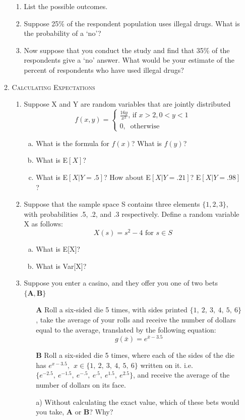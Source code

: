 \documentclass[11pt,letterpaper]{article}
\numberwithin{equation}{section}
\begin{document}
\begin{enumerate}[I]
\begin{enumerate}[1)]
\begin{enumerate}[1)]
\item List the possible outcomes.
\item Suppose 25\% of the respondent population uses illegal drugs. What is the probability of a `no'? 
\item  Now suppose that you conduct the study and find that 35\% of the respondents give a `no' answer. What would be your estimate of the percent of respondents who have used illegal drugs?
\end{enumerate}
\pagebreak
\item \textsc{Calculating Expectations}
\begin{enumerate}[1)]

\item Suppose X and Y are random variables that are jointly distributed 
$$f(x,y)=\begin{cases} \frac{16y}{x^3} \text{, if }x>2, 0<y<1\\ 0, \ \text{ otherwise }\end{cases}$$

\begin{enumerate}[a)]
\item What is the formula for $f(x)$?  What is $f(y)$? 
\item What is E$[X]$? 
\item What is E$[X|Y=.5]$?  How about E$[X|Y=.21]$? E$[X|Y=.98]$?
\end{enumerate}

\item Suppose that the sample space S contains three elements $\{1, 2, 3\}$, with probabilities .5, .2, and .3 respectively.  Define a random variable X as follows:
$$X(s) = s^2 - 4 \text{ for } s \in S$$ 
\begin{enumerate}[a)]
\item What is E[X]? 
\item What is Var[X]?
\end{enumerate}

\item Suppose you enter a casino, and they offer you one of two bets $\{\textbf{A}, \textbf{B}\}$

\begin{enumerate}
\item[\textbf{A}] Roll a six-sided die 5 times, with sides printed $\{1,\ 2,\ 3,\ 4,\ 5,\ 6\}$, take the average of your rolls and receive the number of dollars equal to the average, translated by the following equation:
$$g(\bar{x})=e^{\bar{x}-3.5}$$
\item[\textbf{B}] Roll a six-sided die 5 times, where each of the sides of the die has $e^{x-3.5},\ \ x\in\{1,\ 2,\ 3,\ 4,\ 5,\ 6\}$ written on it.  i.e. $\{e^{-2.5},\ e^{-1.5},\ e^{-.5},\ e^{.5},\ e^{1.5},\ e^{2.5}\}$, and receive the average of the number of dollars on its face.
\end{enumerate}
\begin{enumerate}
\item[a)]  Without calculating the exact value, which of these bets would you take, \textbf{A} or \textbf{B}?  Why?


\end{enumerate}
\end{enumerate}
\end{enumerate}
\end{enumerate}
\end{document}
